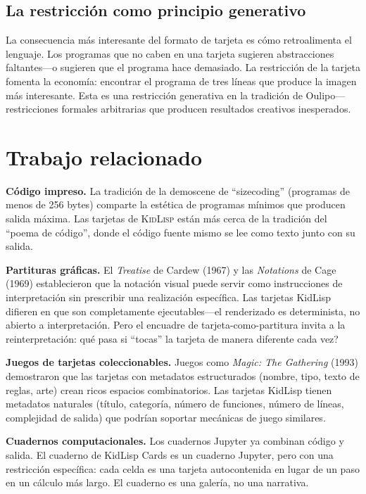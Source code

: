 \documentclass[10pt,letterpaper,twocolumn]{article}
\newcommand{\kidlisp}{\textsc{KidLisp}}
\begin{document}
\subsection{La restricci\'on como principio generativo}

La consecuencia m\'as interesante del formato de tarjeta es c\'omo retroalimenta el lenguaje. Los programas que no caben en una tarjeta sugieren abstracciones faltantes---o sugieren que el programa hace demasiado. La restricci\'on de la tarjeta fomenta la econom\'ia: encontrar el programa de tres l\'ineas que produce la imagen m\'as interesante. Esta es una restricci\'on generativa en la tradici\'on de Oulipo---restricciones formales arbitrarias que producen resultados creativos inesperados.


\section{Trabajo relacionado}

\textbf{C\'odigo impreso.} La tradici\'on de la demoscene de ``sizecoding'' (programas de menos de 256 bytes) comparte la est\'etica de programas m\'inimos que producen salida m\'axima. Las tarjetas de \kidlisp{} est\'an m\'as cerca de la tradici\'on del ``poema de c\'odigo'', donde el c\'odigo fuente mismo se lee como texto junto con su salida.

\textbf{Partituras gr\'aficas.} El \emph{Treatise} de Cardew (1967) y las \emph{Notations} de Cage (1969) establecieron que la notaci\'on visual puede servir como instrucciones de interpretaci\'on sin prescribir una realizaci\'on espec\'ifica. Las tarjetas KidLisp difieren en que son completamente ejecutables---el renderizado es determinista, no abierto a interpretaci\'on. Pero el encuadre de tarjeta-como-partitura invita a la reinterpretaci\'on: \textquestiondown qu\'e pasa si ``tocas'' la tarjeta de manera diferente cada vez?

\textbf{Juegos de tarjetas coleccionables.} Juegos como \emph{Magic: The Gathering} (1993) demostraron que las tarjetas con metadatos estructurados (nombre, tipo, texto de reglas, arte) crean ricos espacios combinatorios. Las tarjetas KidLisp tienen metadatos naturales (t\'itulo, categor\'ia, n\'umero de funciones, n\'umero de l\'ineas, complejidad de salida) que podr\'ian soportar mec\'anicas de juego similares.

\textbf{Cuadernos computacionales.} Los cuadernos Jupyter ya combinan c\'odigo y salida. El cuaderno de KidLisp Cards es un cuaderno Jupyter, pero con una restricci\'on espec\'ifica: cada celda es una tarjeta autocontenida en lugar de un paso en un c\'alculo m\'as largo. El cuaderno es una galer\'ia, no una narrativa.
\end{document}
